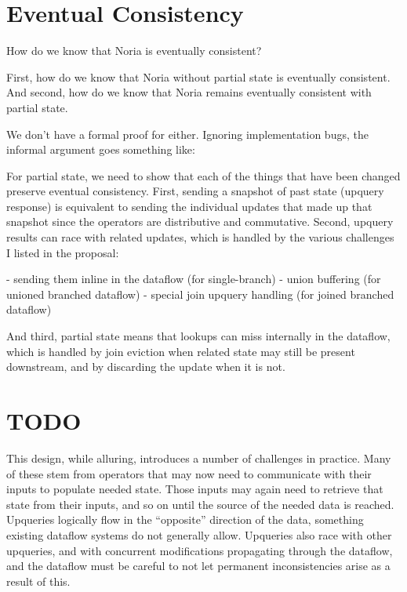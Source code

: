 \resume

\section{Eventual Consistency}

How do we know that Noria is eventually consistent?

First, how do we know that Noria without partial state is eventually
consistent. And second, how do we know that Noria remains eventually
consistent with partial state.

We don't have a formal proof for either. Ignoring implementation bugs, the
informal argument goes something like:

For partial state, we need to show that each of the things that have been
changed preserve eventual consistency. First, sending a snapshot of past state
(upquery response) is equivalent to sending the individual updates that made
up that snapshot since the operators are distributive and commutative. Second,
upquery results can race with related updates, which is handled by the various
challenges I listed in the proposal:

 - sending them inline in the dataflow (for single-branch)
 - union buffering (for unioned branched dataflow)
 - special join upquery handling (for joined branched dataflow)

And third, partial state means that lookups can miss internally in the
dataflow, which is handled by join eviction when related state may still be
present downstream, and by discarding the update when it is not.

\section{TODO}

This design, while alluring, introduces a number of challenges in practice. Many
of these stem from operators that may now need to communicate with their inputs
to populate needed state. Those inputs may again need to retrieve that state
from their inputs, and so on until the source of the needed data is reached.
Upqueries logically flow in the ``opposite'' direction of the data, something
existing dataflow systems do not generally allow. Upqueries also race with other
upqueries, and with concurrent modifications propagating through the dataflow,
and the dataflow must be careful to not let permanent inconsistencies arise as a
result of this.

%
%

